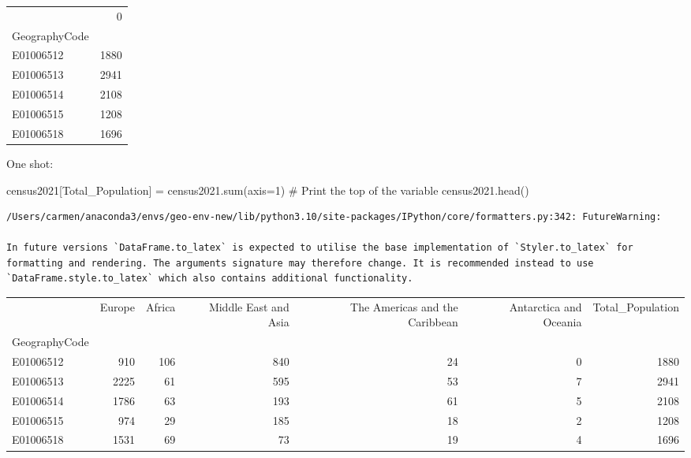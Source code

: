 \documentclass[
  letterpaper,
  DIV=11,
  numbers=noendperiod]{scrreprt}
\newenvironment{Shaded}{\begin{snugshade}}{\end{snugshade}}
\newcommand{\BuiltInTok}[1]{\textcolor[rgb]{0.00,0.23,0.31}{#1}}
\newcommand{\CommentTok}[1]{\textcolor[rgb]{0.37,0.37,0.37}{#1}}
\newcommand{\DecValTok}[1]{\textcolor[rgb]{0.68,0.00,0.00}{#1}}
\newcommand{\NormalTok}[1]{\textcolor[rgb]{0.00,0.23,0.31}{#1}}
\newcommand{\OperatorTok}[1]{\textcolor[rgb]{0.37,0.37,0.37}{#1}}
\newcommand{\StringTok}[1]{\textcolor[rgb]{0.13,0.47,0.30}{#1}}
\begin{document}
\begin{tabular}{lr}
\toprule
{} &     0 \\
GeographyCode &       \\
\midrule
E01006512     &  1880 \\
E01006513     &  2941 \\
E01006514     &  2108 \\
E01006515     &  1208 \\
E01006518     &  1696 \\
\bottomrule
\end{tabular}

One shot:

\begin{Shaded}
\begin{Highlighting}[]
\NormalTok{census2021[}\StringTok{\textquotesingle{}Total\_Population\textquotesingle{}}\NormalTok{] }\OperatorTok{=}\NormalTok{ census2021.}\BuiltInTok{sum}\NormalTok{(axis}\OperatorTok{=}\DecValTok{1}\NormalTok{)}
\CommentTok{\# Print the top of the variable}
\NormalTok{census2021.head()}
\end{Highlighting}
\end{Shaded}

\begin{verbatim}
/Users/carmen/anaconda3/envs/geo-env-new/lib/python3.10/site-packages/IPython/core/formatters.py:342: FutureWarning:

In future versions `DataFrame.to_latex` is expected to utilise the base implementation of `Styler.to_latex` for formatting and rendering. The arguments signature may therefore change. It is recommended instead to use `DataFrame.style.to_latex` which also contains additional functionality.
\end{verbatim}

\begin{tabular}{lrrrrrr}
\toprule
{} &  Europe &  Africa &  Middle East and Asia &  The Americas and the Caribbean &  Antarctica and Oceania &  Total\_Population \\
GeographyCode &         &         &                       &                                 &                         &                   \\
\midrule
E01006512     &     910 &     106 &                   840 &                              24 &                       0 &              1880 \\
E01006513     &    2225 &      61 &                   595 &                              53 &                       7 &              2941 \\
E01006514     &    1786 &      63 &                   193 &                              61 &                       5 &              2108 \\
E01006515     &     974 &      29 &                   185 &                              18 &                       2 &              1208 \\
E01006518     &    1531 &      69 &                    73 &                              19 &                       4 &              1696 \\
\bottomrule
\end{tabular}
\end{document}
